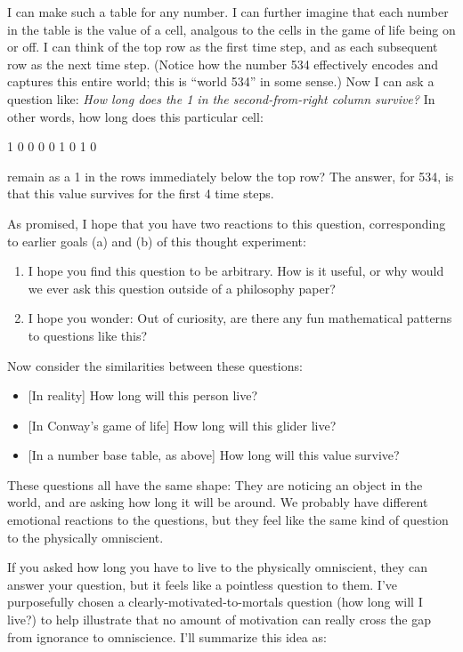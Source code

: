\documentclass[11pt, oneside]{article}   	%
\begin{document}
I can make such a table for any number.
I can further imagine that each number in the table is the value of a cell,
analgous to the cells in the game of life being on or off.
I can think of the
top row as the first time step, and as each subsequent row as the next time
step.
(Notice how the number 534 effectively encodes and captures this entire
world; this is ``world 534'' in some sense.)
Now I can ask a question like:
{\em How long does the 1 in the second-from-right column survive?}
In other words, how long does this particular cell:
\begin{center}
    1 0 0 0 0 1 0 1  0
\end{center}
remain as a 1 in the rows immediately below the top row?
The answer, for 534, is that this value survives for the first 4
time steps.

As promised, I hope that you have two reactions to this question, corresponding
to earlier goals (a) and (b) of this thought experiment:
\begin{enumerate}
    \item I hope you find this question to be arbitrary. How is it useful, or
        why would we ever ask this question outside of a philosophy paper?
    \item I hope you wonder:
        Out of curiosity, are there any fun mathematical patterns to questions
        like this?
\end{enumerate}

Now consider the similarities between these questions:
\begin{itemize}
    \item{} [In reality] How long will this person live?
    \item{} [In Conway's game of life] How long will this glider live?
    \item{} [In a number base table, as above] How long will this value survive?
\end{itemize}
These questions all have the same shape: They are noticing an
object in the world, and are asking how long it will be around.
We probably have different emotional reactions to the questions, but they feel
like the same kind of question to the physically omniscient.

If you asked how long you have to live to the physically omniscient, they can
answer your question, but it feels like a pointless question to them. I've
purposefully chosen a clearly-motivated-to-mortals question (how long will I
live?) to help illustrate
that no amount of motivation can really cross the gap from ignorance to
omniscience. I'll summarize this idea as:
\end{document}
